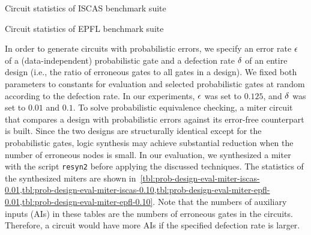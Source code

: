 \begin{table}[ht]
    \centering
    \scriptsize
    \caption{Circuit statistics of ISCAS benchmark suite}
    \label{tbl:prob-design-eval-iscas}
\end{table}

\begin{table}[hp]
    \centering
    \scriptsize
    \caption{Circuit statistics of EPFL benchmark suite}
    \label{tbl:prob-design-eval-epfl}
\end{table}

In order to generate circuits with probabilistic errors,
we specify an error rate $\epsilon$ of a (data-independent) probabilistic gate and
a defection rate $\delta$ of an entire design (i.e., the ratio of erroneous gates to all gates in a design).
We fixed both parameters to constants for evaluation
and selected probabilistic gates at random according to the defection rate.
In our experiments, $\epsilon$ was set to $0.125$, and $\delta$ was set to $0.01$ and $0.1$.
To solve probabilistic equivalence checking,
a miter circuit that compares a design with probabilistic errors against its error-free counterpart is built.
Since the two designs are structurally identical except for the probabilistic gates,
logic synthesis may achieve substantial reduction when the number of erroneous nodes is small.
In our evaluation, we synthesized a miter with the script \texttt{resyn2} before applying the discussed techniques.
The statistics of the synthesized miters are shown in~\cref{tbl:prob-design-eval-miter-iscas-0.01,tbl:prob-design-eval-miter-iscas-0.10,tbl:prob-design-eval-miter-epfl-0.01,tbl:prob-design-eval-miter-epfl-0.10}.
Note that the numbers of auxiliary inputs (AIs) in these tables are the numbers of erroneous gates in the circuits.
Therefore, a circuit would have more AIs if the specified defection rate is larger.

